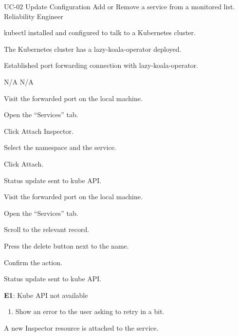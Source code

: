 \vspace{-2em}
\UseCaseDescription
{UC-02}
{Update Configuration}
{Add or Remove a service from a monitored list.}
{Reliability Engineer}
{\begin{CompactItemizes}
    \item kubectl installed and configured to talk to a Kubernetes cluster.
    \item The Kubernetes cluster has a \ac{lazy-koala-operator} deployed.
    \item Established port forwarding connection with \ac{lazy-koala-operator}.
\end{CompactItemizes}}
{N/A}
{N/A}
{\begin{CompactEnumerate}
    \item Visit the forwarded port on the local machine.
    \item Open the “Services” tab.
    \item Click Attach Inspector.
    \item Select the namespace and the service.
    \item Click Attach.
    \item Status update sent to kube API.
\end{CompactEnumerate}}
{{\begin{CompactEnumerate}
    \item Visit the forwarded port on the local machine.
    \item Open the “Services” tab.
    \item Scroll to the relevant record.
    \item Press the delete button next to the name.
    \item Confirm the action.
    \item Status update sent to kube API.
\end{CompactEnumerate}}
{\textbf{E1}: Kube API not available
\vspace{-4mm}\begin{enumerate}
    \item Show an error to the user asking to retry in a bit.
\vspace{-7mm}\end{enumerate}}
{\begin{CompactItemizes}
    \item A new Inspector resource is attached to the service.
\end{CompactItemizes}}}

